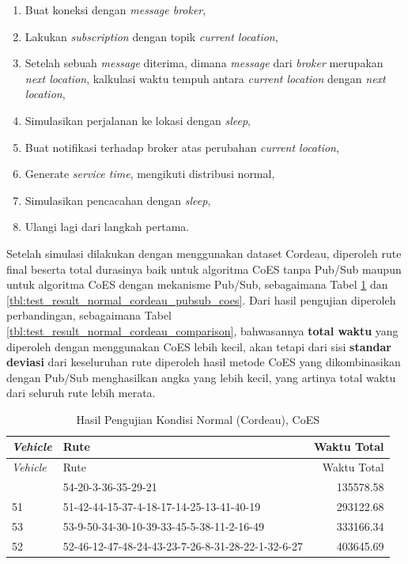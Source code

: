 \begin{enumerate}
\item Buat koneksi dengan \textit{message broker}, 
\item Lakukan \textit{subscription} dengan topik \textit{current location}, 
\item Setelah sebuah \textit{message} diterima, dimana \textit{message} dari \textit{broker} merupakan \textit{next location}, kalkulasi waktu tempuh antara \textit{current location} dengan \textit{next location},
\item Simulasikan perjalanan ke lokasi dengan \textit{sleep},
\item Buat notifikasi terhadap broker atas perubahan \textit{current location}, 
\item Generate \textit{service time}, mengikuti distribusi normal, 
\item Simulasikan pencacahan dengan \textit{sleep}, 
\item Ulangi lagi dari langkah pertama.
\end{enumerate}


Setelah simulasi dilakukan dengan menggunakan dataset Cordeau, diperoleh rute final beserta total durasinya baik untuk algoritma CoES tanpa Pub/Sub maupun untuk algoritma CoES dengan mekanisme Pub/Sub, sebagaimana Tabel \ref{tbl:test_result_normal_cordeau_coes} dan \ref{tbl:test_result_normal_cordeau_pubsub_coes}. Dari hasil pengujian diperoleh perbandingan, sebagaimana Tabel \ref{tbl:test_result_normal_cordeau_comparison}, bahwasannya \textbf{total waktu} yang diperoleh dengan menggunakan CoES lebih kecil, akan tetapi dari sisi \textbf{standar deviasi} dari keseluruhan rute diperoleh hasil metode CoES yang dikombinasikan dengan Pub/Sub menghasilkan angka yang lebih kecil, yang artinya total waktu dari seluruh rute lebih merata.


\begin{longtable}[h]{lp{8cm}r}
	\caption{Hasil Pengujian Kondisi Normal (Cordeau), CoES}
	\label{tbl:test_result_normal_cordeau_coes}\\
	\toprule
		\textit{Vehicle} & Rute & Waktu Total\\ 
	\midrule
	\endfirsthead
	\toprule
		\textit{Vehicle} & Rute & Waktu Total\\ 
	\midrule
	\endhead
	\bottomrule
	\endfoot
		54 & 54-20-3-36-35-29-21 & 135578.58 \\
		51 & 51-42-44-15-37-4-18-17-14-25-13-41-40-19 & 293122.68 \\
		53 & 53-9-50-34-30-10-39-33-45-5-38-11-2-16-49 & 333166.34 \\
		52 & 52-46-12-47-48-24-43-23-7-26-8-31-28-22-1-32-6-27 & 403645.69 \\
\end{longtable}


